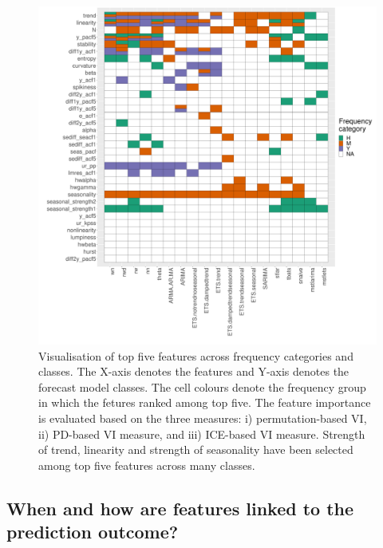 \documentclass[11pt,a4paper,]{article}
\begin{document}
\begin{figure}[h]

{\centering \includegraphics[width=\textwidth]{figure/viplot-1} 

}

\caption{Visualisation  of top five features across frequency categories and classes. The X-axis denotes the features and Y-axis denotes the forecast model classes. The cell colours denote the frequency group in which the fetures ranked among top five. The feature importance is evaluated based on the three measures: i) permutation-based VI, ii) PD-based VI measure, and iii) ICE-based VI measure. Strength of trend, linearity and strength of seasonality have been selected among top five features across many classes.}\label{fig:viplot}
\end{figure}

\clearpage

\hypertarget{when-and-how-are-features-linked-to-the-prediction-outcome}{%
\subsection{When and how are features linked to the prediction outcome?}\label{when-and-how-are-features-linked-to-the-prediction-outcome}}
\end{document}
